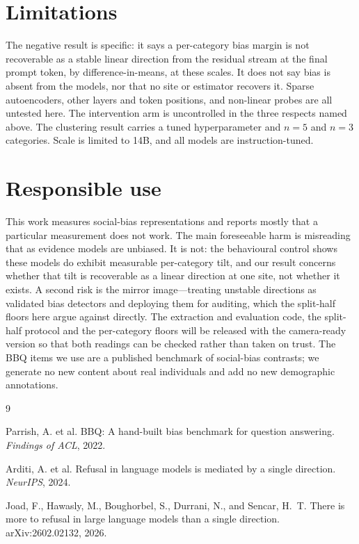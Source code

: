 \documentclass{article}
\begin{document}
\section{Limitations}

The negative result is specific: it says a per-category bias margin is not
recoverable as a stable linear direction from the residual stream at the final
prompt token, by difference-in-means, at these scales. It does not say bias is
absent from the models, nor that no site or estimator recovers it. Sparse
autoencoders, other layers and token positions, and non-linear probes are all
untested here. The intervention arm is uncontrolled in the three respects named
above. The clustering result carries a tuned hyperparameter and $n=5$ and $n=3$
categories. Scale is limited to 14B, and all models are instruction-tuned.

\section*{Responsible use}

This work measures social-bias representations and reports mostly that a
particular measurement does not work. The main foreseeable harm is misreading
that as evidence models are unbiased. It is not: the behavioural control shows
these models do exhibit measurable per-category tilt, and our result concerns
whether that tilt is recoverable as a linear direction at one site, not whether
it exists. A second risk is the mirror image---treating unstable directions as
validated bias detectors and deploying them for auditing, which the split-half
floors here argue against directly. The extraction and evaluation code, the split-half protocol and the
per-category floors will be released with the camera-ready version so that both
readings can be checked rather than taken on trust. The BBQ items we use are a
published benchmark of social-bias contrasts; we generate no new content about
real individuals and add no new demographic annotations.


\begin{thebibliography}{9}

Parrish, A. et al.
\newblock BBQ: A hand-built bias benchmark for question answering.
\newblock \emph{Findings of ACL}, 2022.

Arditi, A. et al.
\newblock Refusal in language models is mediated by a single direction.
\newblock \emph{NeurIPS}, 2024.

Joad, F., Hawasly, M., Boughorbel, S., Durrani, N., and Sencar, H.~T.
\newblock There is more to refusal in large language models than a single direction.
\newblock arXiv:2602.02132, 2026.

\end{thebibliography}
\end{document}

